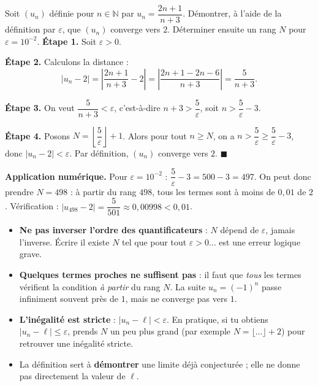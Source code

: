 \documentclass[11pt]{article}
\begin{document}
\begin{exoresolu}[Convergence de $u_n = \dfrac{2n+1}{n+3}$ vers $2$]
Soit $(u_n)$ définie pour $n \in \mathbb{N}$ par $u_n = \dfrac{2n+1}{n+3}$. Démontrer, à l'aide de la définition par $\varepsilon$, que $(u_n)$ converge vers $2$. Déterminer ensuite un rang $N$ pour $\varepsilon = 10^{-2}$.
\tcblower
\textbf{Étape 1.} Soit $\varepsilon > 0$.

\textbf{Étape 2.} Calculons la distance :
\[
|u_n - 2| = \left|\dfrac{2n+1}{n+3} - 2\right| = \left|\dfrac{2n+1 - 2n - 6}{n+3}\right| = \dfrac{5}{n+3}.
\]

\textbf{Étape 3.} On veut $\dfrac{5}{n+3} < \varepsilon$, c'est-à-dire $n + 3 > \dfrac{5}{\varepsilon}$, soit $n > \dfrac{5}{\varepsilon} - 3$.

\textbf{Étape 4.} Posons $N = \left\lfloor \dfrac{5}{\varepsilon} \right\rfloor + 1$. Alors pour tout $n \geq N$, on a $n > \dfrac{5}{\varepsilon} \ge \dfrac{5}{\varepsilon} - 3$, donc $|u_n - 2| < \varepsilon$. Par définition, $(u_n)$ converge vers $2$. $\blacksquare$

\textbf{Application numérique.} Pour $\varepsilon = 10^{-2}$ : $\dfrac{5}{\varepsilon} - 3 = 500 - 3 = 497$. On peut donc prendre $N = 498$ : à partir du rang $498$, tous les termes sont à moins de $0{,}01$ de $2$. Vérification : $|u_{498} - 2| = \dfrac{5}{501} \approx 0{,}00998 < 0{,}01$.
\end{exoresolu}

\begin{attention}
\begin{itemize}
\item \textbf{Ne pas inverser l'ordre des quantificateurs} : $N$ dépend de $\varepsilon$, jamais l'inverse. Écrire \og il existe $N$ tel que pour tout $\varepsilon > 0$... \fg{} est une erreur logique grave.
\item \textbf{Quelques termes proches ne suffisent pas} : il faut que \emph{tous} les termes vérifient la condition \emph{à partir} du rang $N$. La suite $u_n = (-1)^n$ passe infiniment souvent près de $1$, mais ne converge pas vers $1$.
\item \textbf{L'inégalité est stricte} : $|u_n - \ell| < \varepsilon$. En pratique, si tu obtiens $|u_n - \ell| \leq \varepsilon$, prends $N$ un peu plus grand (par exemple $N = \lfloor \dots \rfloor + 2$) pour retrouver une inégalité stricte.
\item La définition sert à \textbf{démontrer} une limite déjà conjecturée ; elle ne donne pas directement la valeur de $\ell$.
\end{itemize}
\end{attention}
\end{document}
